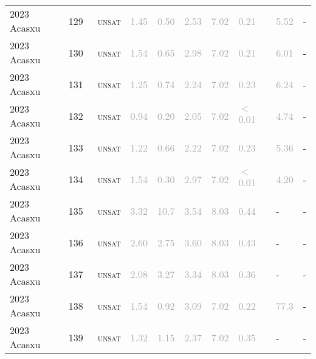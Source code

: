 \begin{center}
{\begin{longtable}{@{}llllllllll@{}}
2023 Acasxu & 129 & ~\textsc{unsat} & \textcolor{darkgray}{1.45} & \textcolor{darkgray}{0.50} & \textcolor{darkgray}{2.53} & \textcolor{darkgray}{7.02} & \textcolor{darkgray}{0.21} & \textcolor{darkgray}{5.52} & - \\
2023 Acasxu & 130 & ~\textsc{unsat} & \textcolor{darkgray}{1.54} & \textcolor{darkgray}{0.65} & \textcolor{darkgray}{2.98} & \textcolor{darkgray}{7.02} & \textcolor{darkgray}{0.21} & \textcolor{darkgray}{6.01} & - \\
2023 Acasxu & 131 & ~\textsc{unsat} & \textcolor{darkgray}{1.25} & \textcolor{darkgray}{0.74} & \textcolor{darkgray}{2.24} & \textcolor{darkgray}{7.02} & \textcolor{darkgray}{0.23} & \textcolor{darkgray}{6.24} & - \\
2023 Acasxu & 132 & ~\textsc{unsat} & \textcolor{darkgray}{0.94} & \textcolor{darkgray}{0.20} & \textcolor{darkgray}{2.05} & \textcolor{darkgray}{7.02} & \textcolor{darkgray}{$<$0.01} & \textcolor{darkgray}{4.74} & - \\
2023 Acasxu & 133 & ~\textsc{unsat} & \textcolor{darkgray}{1.22} & \textcolor{darkgray}{0.66} & \textcolor{darkgray}{2.22} & \textcolor{darkgray}{7.02} & \textcolor{darkgray}{0.23} & \textcolor{darkgray}{5.36} & - \\
2023 Acasxu & 134 & ~\textsc{unsat} & \textcolor{darkgray}{1.54} & \textcolor{darkgray}{0.30} & \textcolor{darkgray}{2.97} & \textcolor{darkgray}{7.02} & \textcolor{darkgray}{$<$0.01} & \textcolor{darkgray}{4.20} & - \\
2023 Acasxu & 135 & ~\textsc{unsat} & \textcolor{darkgray}{3.32} & \textcolor{darkgray}{10.7} & \textcolor{darkgray}{3.54} & \textcolor{darkgray}{8.03} & \textcolor{darkgray}{0.44} & - & - \\
2023 Acasxu & 136 & ~\textsc{unsat} & \textcolor{darkgray}{2.60} & \textcolor{darkgray}{2.75} & \textcolor{darkgray}{3.60} & \textcolor{darkgray}{8.03} & \textcolor{darkgray}{0.43} & - & - \\
2023 Acasxu & 137 & ~\textsc{unsat} & \textcolor{darkgray}{2.08} & \textcolor{darkgray}{3.27} & \textcolor{darkgray}{3.34} & \textcolor{darkgray}{8.03} & \textcolor{darkgray}{0.36} & - & - \\
2023 Acasxu & 138 & ~\textsc{unsat} & \textcolor{darkgray}{1.54} & \textcolor{darkgray}{0.92} & \textcolor{darkgray}{3.09} & \textcolor{darkgray}{7.02} & \textcolor{darkgray}{0.22} & \textcolor{darkgray}{77.3} & - \\
2023 Acasxu & 139 & ~\textsc{unsat} & \textcolor{darkgray}{1.32} & \textcolor{darkgray}{1.15} & \textcolor{darkgray}{2.37} & \textcolor{darkgray}{7.02} & \textcolor{darkgray}{0.35} & - & - \\

\end{longtable}}
\end{center}
